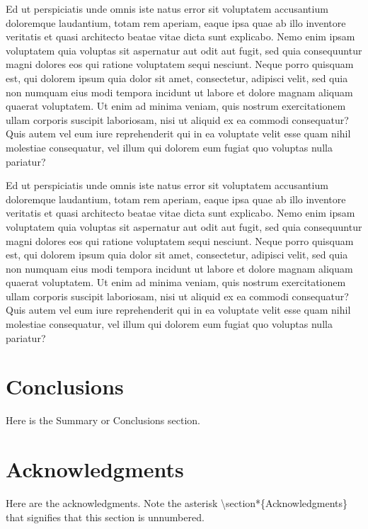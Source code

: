 \documentclass[10pt,a4paper,twocolumn]{article}
\begin{document}
Ed ut perspiciatis unde omnis iste natus error sit voluptatem accusantium doloremque laudantium, totam rem aperiam, eaque ipsa quae ab illo inventore veritatis et quasi architecto beatae vitae dicta sunt explicabo. Nemo enim ipsam voluptatem quia voluptas sit aspernatur aut odit aut fugit, sed quia consequuntur magni dolores eos qui ratione voluptatem sequi nesciunt. Neque porro quisquam est, qui dolorem ipsum quia dolor sit amet, consectetur, adipisci velit, sed quia non numquam eius modi tempora incidunt ut labore et dolore magnam aliquam quaerat voluptatem. Ut enim ad minima veniam, quis nostrum exercitationem ullam corporis suscipit laboriosam, nisi ut aliquid ex ea commodi consequatur? Quis autem vel eum iure reprehenderit qui in ea voluptate velit esse quam nihil molestiae consequatur, vel illum qui dolorem eum fugiat quo voluptas nulla pariatur?


Ed ut perspiciatis unde omnis iste natus error sit voluptatem accusantium doloremque laudantium, totam rem aperiam, eaque ipsa quae ab illo inventore veritatis et quasi architecto beatae vitae dicta sunt explicabo. Nemo enim ipsam voluptatem quia voluptas sit aspernatur aut odit aut fugit, sed quia consequuntur magni dolores eos qui ratione voluptatem sequi nesciunt. Neque porro quisquam est, qui dolorem ipsum quia dolor sit amet, consectetur, adipisci velit, sed quia non numquam eius modi tempora incidunt ut labore et dolore magnam aliquam quaerat voluptatem. Ut enim ad minima veniam, quis nostrum exercitationem ullam corporis suscipit laboriosam, nisi ut aliquid ex ea commodi consequatur? Quis autem vel eum iure reprehenderit qui in ea voluptate velit esse quam nihil molestiae consequatur, vel illum qui dolorem eum fugiat quo voluptas nulla pariatur?


\section{Conclusions}
Here is the Summary or Conclusions section.

\section*{Acknowledgments}
Here are the acknowledgments. Note the asterisk \textbackslash{\ttfamily section*}\{{\ttfamily Acknowledgments}\} that signifies that this section is unnumbered.



\end{document}

